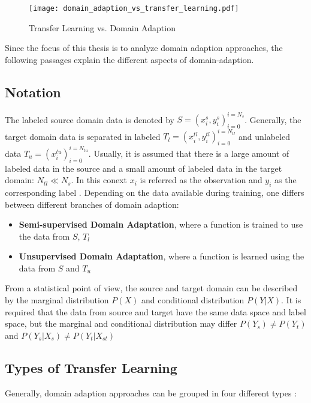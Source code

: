 \begin{figure}[H]
  \centering
  \texttt{[image: domain\_adaption\_vs\_transfer\_learning.pdf]}
  \caption {Transfer Learning vs. Domain Adaption} \label{fig:domain_adaption_vs_transfer_learning}
\end{figure}


Since the focus of this thesis is to analyze domain adaption approaches, the following passages explain the different aspects of domain-adaption.
\subsection{Notation}
The labeled source domain data is denoted by  $S = {(x_{i}^{s}, y_{i}^{s})_{i = 0}^{i = N_{s}}}$. Generally, the target domain data is separated in labeled $T_{l} = {(x_{i}^{tl}, y_{i}^{tl})_{i = 0}^{i = N_{tl}}}$ and unlabeled data $T_{u} = {(x_{i}^{tu})_{i = 0}^{i = N_{tu}}}$. Usually, it is assumed that there is a large amount of labeled data in the source and a small amount of labeled data in the target domain: $N_{tl} \ll N_{s}$. In this conext $x_{i}$ is referred as the observation and $y_{i}$ as the corresponding label  \cite{Patel2015}. Depending on the data available during training, one differs between different branches of domain adaption: 
\begin{itemize}
\item \textbf{Semi-supervised Domain Adaptation}, where a function is trained to use the data from $S$, $T_{l}$
\item \textbf{Unsupervised Domain Adaptation}, where a function is learned using the data from $S$ and $T_{u}$ \cite{Patel2015} 
\end{itemize}

From a statistical point of view, the source and target domain can be described by the marginal distribution $P(X)$ and conditional distribution $P(Y|X)$. It is required that the data from source and target have the same data space and label space, but the marginal and conditional distribution may differ $P(Y_{s}) \neq P(Y_{t})$ and $P(Y_{s}|X_{s}) \neq P(Y_{t}|X_{st})$ \cite{Qikang2020}

\subsection{Types of Transfer Learning}
Generally, domain adaption approaches can be grouped in four different types \cite{AZAMFAR2020103932}:  

